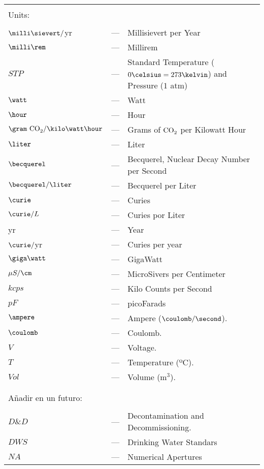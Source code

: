 \begin{longtable}{p{25mm} c p{120mm} }
\\
\\

\multicolumn{3}{l}{Units:}\\
\\
$\milli\sievert/$yr & --- & Millisievert per Year\\
$\milli\rem$ & --- & Millirem\\

$STP$ & --- & Standard Temperature ($0\celsius=273\kelvin$) and Pressure ($1$ atm)\\
$\watt$ & --- & Watt\\
$\hour$ & --- & Hour\\
$\gram~\ce{CO_2} /\kilo\watt\hour$ & --- & Grams of $\ce{CO_2}$ per Kilowatt Hour\\
$\liter$ & --- & Liter\\
$\becquerel$ & --- & Becquerel, Nuclear Decay Number per Second\\
$\becquerel/\liter$ & --- & Becquerel per Liter\\
$\curie$ & --- & Curies\\
$\curie/L$ & --- & Curies por Liter\\
yr & --- & Year\\
$\curie/$yr & --- & Curies per year\\
$\giga\watt$ & --- & GigaWatt\\
$\mu S/\cm$ & --- & MicroSivers per Centimeter\\
$kcps$ & --- & Kilo Counts per Second\\
$pF$ & --- & picoFarads\\
$\ampere$ & --- & Ampere ($\coulomb/\second$).\\
$\coulomb$ & --- & Coulomb.\\
$V$ & --- & Voltage.\\
$T$ & --- & Temperature (ºC).\\
$Vol$ & --- & Volume (m$^3$).\\


\\
\\
\multicolumn{3}{l}{Añadir en un futuro:}\\
\\
$D\&D$ & --- & Decontamination and Decommissioning.\\
$DWS$ & --- & Drinking Water Standars\\
$NA$ & --- & Numerical Apertures\\

\end{longtable}
